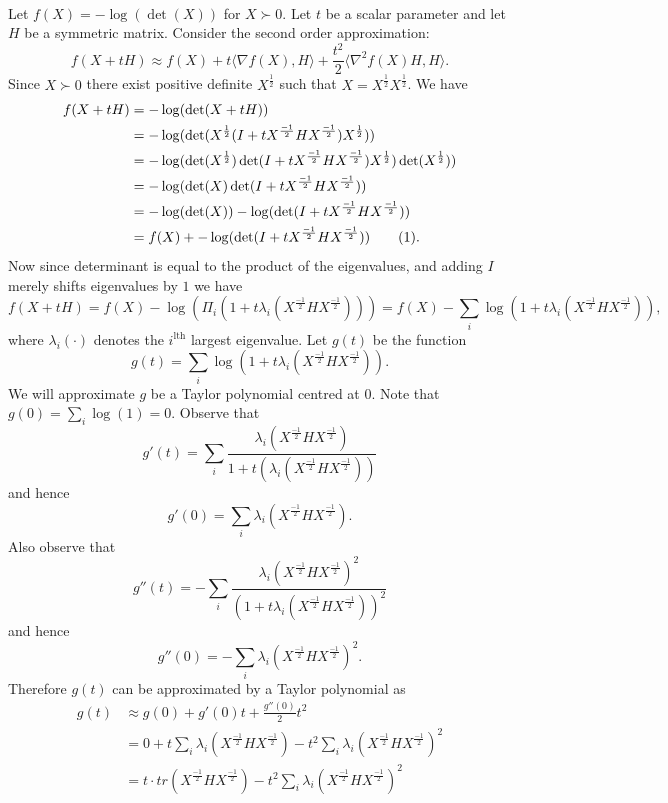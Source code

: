 \documentclass[letterpaper,12pt,oneside,onecolumn]{article}
\newcommand{\1}{\mathbbm{1}}
\newcommand\numberthis{\addtocounter{equation}{1}\tag{\theequation}}
\begin{document}
\paragraph{}
Let $f(X) = -\log(\det(X))$ for $X \succ 0$. Let $t$ be a scalar parameter and let $H$ be a symmetric matrix. Consider the second order approximation:
\begin{equation}f(X + tH) \approx f(X) + t\langle \nabla f(X), H \rangle + \frac{t^2}{2}\langle \nabla^2f(X)H, H\rangle.\label{eq:soa}\end{equation}
Since $X \succ 0$ there exist positive definite $X^\frac{1}{2}$ such that $X = X^\frac{1}{2}X^\frac{1}{2}$. We have
\begin{align*}
f(X + tH) &= -\log(\det(X + tH)) \\
&= -\log(\det(X^\frac{1}{2}(I + tX^\frac{-1}{2}HX^\frac{-1}{2})X^\frac{1}{2})) \\
&= -\log(\det(X^\frac{1}{2})\det(I + tX^\frac{-1}{2}HX^\frac{-1}{2})X^\frac{1}{2})\det(X^\frac{1}{2}))\\
&=-\log(\det(X)\det(I + tX^\frac{-1}{2}HX^\frac{-1}{2})) \\
&=-\log(\det(X)) -\log(\det(I + tX^\frac{-1}{2}HX^\frac{-1}{2}))\\
&= f(X) + -\log(\det(I + tX^\frac{-1}{2}HX^\frac{-1}{2})) \label{eq:taylor} \numberthis.
\end{align*}
Now since determinant is equal to the product of the eigenvalues, and adding $I$ merely shifts eigenvalues by $1$ we have
$$f(X+tH) = f(X) -\log(\Pi_{i}(1+t\lambda_i(X^\frac{-1}{2}HX^\frac{-1}{2}))) = f(X) -\sum_i \log(1+t\lambda_i(X^\frac{-1}{2}HX^\frac{-1}{2})),$$
where $\lambda_i(\cdot)$ denotes the $i^\text{lth}$ largest eigenvalue. Let $g(t)$ be the function
$$g(t) = \sum_i \log(1+t\lambda_i(X^\frac{-1}{2}HX^\frac{-1}{2})).$$
We will approximate $g$ be a Taylor polynomial centred at $0$. Note that $g(0) = \sum_i \log(1) = 0$. Observe that
$$g'(t) = \sum_{i}\frac{\lambda_i(X^\frac{-1}{2}HX^\frac{-1}{2})}{1 + t(\lambda_i(X^\frac{-1}{2}HX^\frac{-1}{2}))}$$
and hence
$$g'(0) = \sum_{i} \lambda_i(X^\frac{-1}{2}HX^\frac{-1}{2}).$$
Also observe that
$$g''(t) = -\sum_{i} \frac{\lambda_i(X^\frac{-1}{2}HX^\frac{-1}{2})^2}{(1+t\lambda_i(X^\frac{-1}{2}HX^\frac{-1}{2}))^2}$$
and hence
$$g''(0)  = -\sum_{i} \lambda_i(X^\frac{-1}{2}HX^\frac{-1}{2})^2.$$
Therefore $g(t)$ can be approximated by a Taylor polynomial as
\begin{align*}g(t) &\approx g(0) + g'(0)t + \frac{g''(0)}{2} t^2 \\
&= 0 + t\sum_{i} \lambda_i(X^\frac{-1}{2}HX^\frac{-1}{2}) - t^2 \sum_{i} \lambda_i(X^\frac{-1}{2}HX^\frac{-1}{2})^2 \\
&= t\cdot tr(X^\frac{-1}{2}HX^\frac{-1}{2}) -t^2 \sum_i\lambda_i(X^\frac{-1}{2}HX^\frac{-1}{2})^2
\end{align*}
\end{document}
